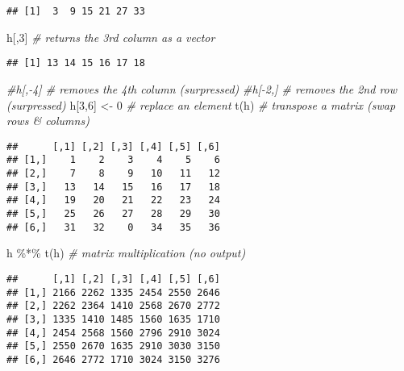 \documentclass[
]{article}
\newenvironment{Shaded}{\begin{snugshade}}{\end{snugshade}}
\newcommand{\CommentTok}[1]{\textcolor[rgb]{0.56,0.35,0.01}{\textit{#1}}}
\newcommand{\DecValTok}[1]{\textcolor[rgb]{0.00,0.00,0.81}{#1}}
\newcommand{\FunctionTok}[1]{\textcolor[rgb]{0.00,0.00,0.00}{#1}}
\newcommand{\NormalTok}[1]{#1}
\newcommand{\OtherTok}[1]{\textcolor[rgb]{0.56,0.35,0.01}{#1}}
\newcommand{\SpecialCharTok}[1]{\textcolor[rgb]{0.00,0.00,0.00}{#1}}
\begin{document}
\begin{verbatim}
## [1]  3  9 15 21 27 33
\end{verbatim}

\begin{Shaded}
\begin{Highlighting}[]
\NormalTok{h[,}\DecValTok{3}\NormalTok{]                       }\CommentTok{\# returns the 3rd column as a vector}
\end{Highlighting}
\end{Shaded}

\begin{verbatim}
## [1] 13 14 15 16 17 18
\end{verbatim}

\begin{Shaded}
\begin{Highlighting}[]
\CommentTok{\#h[,{-}4]                 \# removes the 4th column (surpressed)}
\CommentTok{\#h[{-}2,]                 \# removes the 2nd row (surpressed)}
\NormalTok{h[}\DecValTok{3}\NormalTok{,}\DecValTok{6}\NormalTok{] }\OtherTok{\textless{}{-}} \DecValTok{0}             \CommentTok{\# replace an element}
\FunctionTok{t}\NormalTok{(h)                        }\CommentTok{\# transpose a matrix (swap rows \& columns)}
\end{Highlighting}
\end{Shaded}

\begin{verbatim}
##      [,1] [,2] [,3] [,4] [,5] [,6]
## [1,]    1    2    3    4    5    6
## [2,]    7    8    9   10   11   12
## [3,]   13   14   15   16   17   18
## [4,]   19   20   21   22   23   24
## [5,]   25   26   27   28   29   30
## [6,]   31   32    0   34   35   36
\end{verbatim}

\begin{Shaded}
\begin{Highlighting}[]
\NormalTok{h }\SpecialCharTok{\%*\%} \FunctionTok{t}\NormalTok{(h)              }\CommentTok{\# matrix multiplication (no output)}
\end{Highlighting}
\end{Shaded}

\begin{verbatim}
##      [,1] [,2] [,3] [,4] [,5] [,6]
## [1,] 2166 2262 1335 2454 2550 2646
## [2,] 2262 2364 1410 2568 2670 2772
## [3,] 1335 1410 1485 1560 1635 1710
## [4,] 2454 2568 1560 2796 2910 3024
## [5,] 2550 2670 1635 2910 3030 3150
## [6,] 2646 2772 1710 3024 3150 3276
\end{verbatim}
\end{document}
